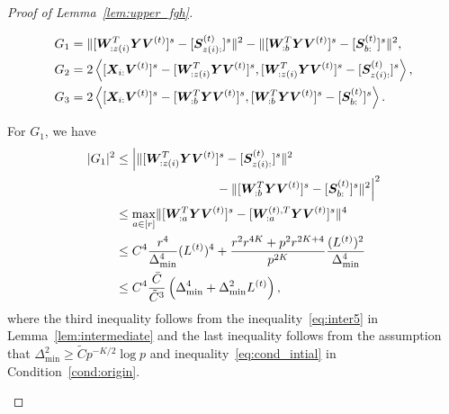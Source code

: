 \documentclass[journal]{IEEEtran}
\theoremstyle{definition}
\theoremstyle{definition}
\newcommand{\of}[1]{\left(#1\right)}
\newcommand{\ang}[1]{\left\langle#1\right\rangle}
\begin{document}
\begin{proof}[Proof of Lemma~\ref{lem:upper_fgh}]
\begin{enumerate}[wide]
    \vspace{-0.5cm}
    \small
    \begin{align}
        G_1 &= \onormSize{}{ [  \mW_{:z(i)}^T \mY \mV^{(t)} ]^s -  [  \mS_{z(i):}^{(t)}  ]^s}^2 - \onormSize{}{ [  \mW_{:b}^T \mY \mV^{(t)} ]^s -  [  \mS_{b:}^{(t)}  ]^s }^2,\\
        G_2 &= 2 \ang{ [\mX_{i:} \mV^{(t)}]^s  -  [  \mW_{:z(i)}^T \mY \mV^{(t)} ]^s,   [  \mW_{:z(i)}^T \mY \mV^{(t)} ]^s -  [  \mS_{z(i):}^{(t)}  ]^s},\\
        G_3 & = 2 \ang{ [\mX_{i:} \mV^{(t)}]^s  -  [  \mW_{:b}^T \mY \mV^{(t)} ]^s,  [  \mW_{:b}^T \mY \mV^{(t)} ]^s -  [  \mS_{b:}^{(t)}  ]^s}.
    \end{align}
    \normalsize
    
    For $G_1$, we have 
    \begin{align}
        |G_1|^2 &\leq \Big| \onormSize{}{ [ \mW_{:z(i)}^T \mY \mV^{(t)} ]^s - [ \mS_{z(i):}^{(t)}  ]^s}^2 \\
        & \quad \quad \quad \quad \quad  \quad \quad \quad - \onormSize{}{ [ \mW_{:b}^T \mY \mV^{(t)} ]^s -  [ \mS_{b:}^{(t)}  ]^s }^2 \Big|^2 \\
        & \leq \max_{a \in [r]} \onormSize{}{ [ \mW_{:a}^T \mY \mV^{(t)} ]^s - [ \mW_{:a}^{(t),T} \mY \mV^{(t)}  ]^s}^4\\
        & \leq C^4 \frac{r^4}{\Delta_{\min}^4} (L^{(t)})^4 +  \frac{r^2 r^{4K} + p^2r^{2K+4}}{p^{2K}} \frac{(L^{(t)})^2}{\Delta_{\min}^4} \\
        & \leq C^4 \frac{\bar C}{\tilde C^3} \of{\Delta_{\min}^4 +  \Delta_{\min}^2 L^{(t)}}, \label{eq:g1}
    \end{align}
    where the third inequality follows from the inequality~\eqref{eq:inter5} in Lemma~\ref{lem:intermediate} and the last inequality follows from the assumption that $\Delta_{\min}^2 \geq \tilde C p^{-K/2}\log p$ and inequality~\eqref{eq:cond_intial} in Condition~\ref{cond:origin}.
    

\end{enumerate}
\end{proof}
\end{document}
